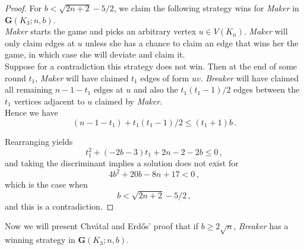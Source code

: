 \documentclass[a4paper,oneside,11pt]{report}
\begin{document}
\begin{proof}

For $b < \sqrt{2n+2}-5/2$, we claim the following strategy wins for \textit{Maker} in $\textbf{G}(K_3;n,b)$.\\

\textit{Maker} starts the game and picks an arbitrary vertex $u \in V(K_n)$. \textit{Maker} will only claim edges at $u$ unless she has a chance to claim an edge that wins her the game, in which case she will deviate and claim it.\\

Suppose for a contradiction this strategy does not win. Then at the end of some round $t_1$, \textit{Maker} will have claimed $t_1$ edges of form $uv$. \textit{Breaker} will have claimed all remaining $n-1-t_1$ edges at $u$ and also the $t_1(t_1-1)/2$ edges between the $t_1$ vertices adjacent to $u$ claimed by \textit{Maker}.\\

Hence we have
\begin{equation}    
(n-1-t_1)+t_1(t_1-1)/2 \leqslant (t_1+1)b \,. \label{X}\end{equation}

Rearranging yields \[t_1^2+(-2b-3)t_1+2n-2-2b \leqslant 0 \, ,\]and taking the discriminant implies a solution does not exist for \[4b^2+20b-8n+17<0 \, ,\] which is the case when \[b < \sqrt{2n+2} - 5/2 \, ,\] and this is a contradiction.

\end{proof}

Now we will present Chvátal and Erdős' proof that if $b \geqslant 2\sqrt{n}$, \textit{Breaker} has a winning strategy in $\textbf{G}(K_3;n,b)$.
\end{document}
